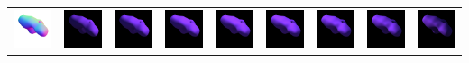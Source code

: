 \begin{center}
\begin{longtable}{@{}c@{}c@{}c@{}c@{}c@{}c@{}c@{}c@{}c@{}}
\includegraphics[width=0.1\linewidth]{training/44_gt.png} & \includegraphics[width=0.1\linewidth]{training/44_0.png} &
\includegraphics[width=0.1\linewidth]{training/44_1.png} & \includegraphics[width=0.1\linewidth]{training/44_2.png} &
\includegraphics[width=0.1\linewidth]{training/44_3.png} & \includegraphics[width=0.1\linewidth]{training/44_4.png} &
\includegraphics[width=0.1\linewidth]{training/44_5.png} & \includegraphics[width=0.1\linewidth]{training/44_6.png} &
\includegraphics[width=0.1\linewidth]{training/44_7.png} \\
\end{longtable}
\end{center}